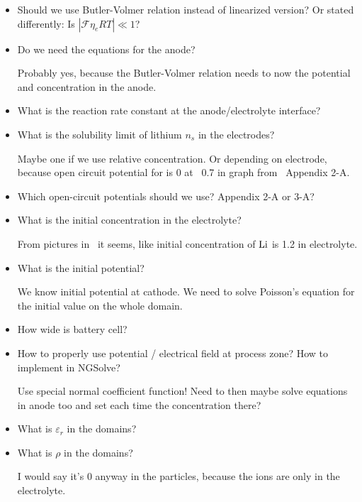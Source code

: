 \documentclass[a4paper,11pt]{scrartcl}
\newcommand*{\Li}{\ce{Li}}
\newcommand*{\F}{\mathcal{F}}
\begin{document}
\begin{itemize}
\item Should we use Butler-Volmer relation instead of linearized version?
  Or stated differently: Is $|\F \eta_e R T| \ll 1$?

\item Do we need the equations for the anode?

  Probably yes, because the Butler-Volmer relation needs to now the potential
  and concentration in the anode.

\item What is the reaction rate constant at the anode/electrolyte interface?

\item What is the solubility limit of lithium $n_s$ in the electrodes?

  Maybe one if we use relative concentration. Or depending on electrode, because
  open circuit potential for  is 0 at ~0.7 in graph from~\cite{doyle95} Appendix 2-A.

\item Which open-circuit potentials should we use? Appendix 2-A or 3-A?

\item What is the initial concentration in the electrolyte?

  From pictures in~\cite{garcia05} it seems, like initial concentration of $\Li$
  is \num{1.2} in electrolyte.

\item What is the initial potential?

  We know initial potential at cathode.
  We need to solve Poisson's equation for the initial value on the whole domain.

\item How wide is battery cell?

\item How to properly use potential / electrical field at process zone? How to
  implement in NGSolve?

  Use special normal coefficient function! Need to then maybe solve equations in
  anode too and set each time the concentration there?

\item What is $\varepsilon_r$ in the domains?

\item What is $\rho$ in the domains?

  I would say it's 0 anyway in the particles, because the ions are only in the electrolyte.

\end{itemize}

{}

\end{document}
